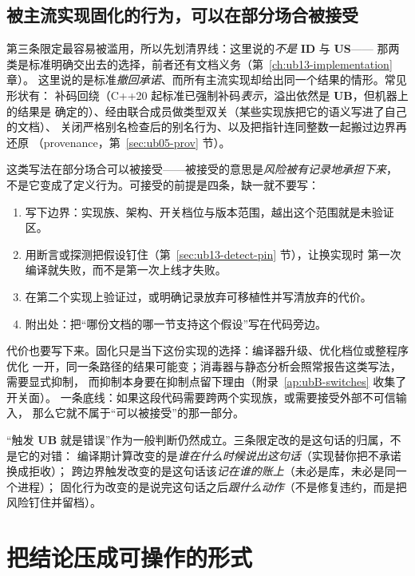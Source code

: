 \documentclass[12pt,a4paper,fontset=fandol]{ctexbook}
\newcommand{\cpp}[1]{C++#1}
\newcommand{\UB}{\textbf{\textsf{UB}}}
\newcommand{\IDB}{\textbf{\textsf{ID}}}
\newcommand{\USB}{\textbf{\textsf{US}}}
\begin{document}
\subsection{被主流实现固化的行为，可以在部分场合被接受}\label{sec:ub02-limit-frozen}

第三条限定最容易被滥用，所以先划清界线：这里说的\emph{不是} \IDB{} 与 \USB{}——
那两类是标准明确交出去的选择，前者还有文档义务（第~\ref{ch:ub13-implementation} 章）。
这里说的是标准\emph{撤回承诺}、而所有主流实现却给出同一个结果的情形。常见形状有：
补码回绕（\cpp{20} 起标准已强制补码\emph{表示}，溢出依然是 \UB{}，但机器上的结果是
确定的）、经由联合成员做类型双关（某些实现族把它的语义写进了自己的文档）、
关闭严格别名检查后的别名行为、以及把指针连同整数一起搬过边界再还原
（provenance，第~\ref{sec:ub05-prov} 节）。

这类写法在部分场合可以被接受——被接受的意思是\emph{风险被有记录地承担下来}，
不是它变成了定义行为。可接受的前提是四条，缺一就不要写：

\begin{enumerate}
  \item 写下边界：实现族、架构、开关档位与版本范围，越出这个范围就是未验证区。
  \item 用断言或探测把假设钉住（第~\ref{sec:ub13-detect-pin} 节），让换实现时
        第一次编译就失败，而不是第一次上线才失败。
  \item 在第二个实现上验证过，或明确记录放弃可移植性并写清放弃的代价。
  \item 附出处：把“哪份文档的哪一节支持这个假设”写在代码旁边。
\end{enumerate}

代价也要写下来。固化只是当下这份实现的选择：编译器升级、优化档位或整程序优化
一开，同一条路径的结果可能变；消毒器与静态分析会照常报告这类写法，需要显式抑制，
而抑制本身要在抑制点留下理由（附录~\ref{ap:ubB-switches} 收集了开关面）。
一条底线：如果这段代码需要跨两个实现族，或需要接受外部不可信输入，
那么它就不属于“可以被接受”的那一部分。

\begin{note}[title={三条限定共同不改的那句话}]
“触发 \UB{} 就是错误”作为一般判断仍然成立。三条限定改的是这句话的归属，不是它的对错：
编译期计算改变的是\emph{谁在什么时候说出这句话}（实现替你把不承诺换成拒收）；
跨边界触发改变的是这句话该\emph{记在谁的账上}（未必是库，未必是同一个进程）；
固化行为改变的是说完这句话之后\emph{跟什么动作}（不是修复违约，而是把风险钉住并留档）。
\end{note}

\section{把结论压成可操作的形式}\label{sec:ub02-practice}
\end{document}
